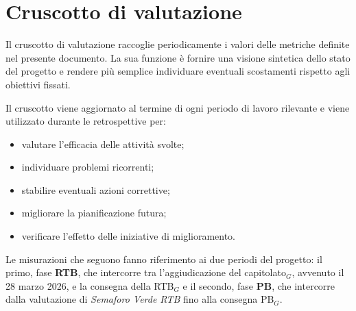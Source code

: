 \documentclass[a4paper, 10pt, colorlinks=true, linkcolor=black, urlcolor=blue, citecolor=blue, hidelinks]{article}
\begin{document}
\section{Cruscotto di valutazione}

Il cruscotto di valutazione raccoglie periodicamente i valori delle metriche definite nel presente documento. La sua funzione è fornire una visione sintetica dello stato del progetto e rendere più semplice individuare eventuali scostamenti rispetto agli obiettivi fissati.

Il cruscotto viene aggiornato al termine di ogni periodo di lavoro rilevante e viene utilizzato durante le retrospettive per:
\begin{itemize}
    \item valutare l'efficacia delle attività svolte;
    \item individuare problemi ricorrenti;
    \item stabilire eventuali azioni correttive;
    \item migliorare la pianificazione futura;
    \item verificare l'effetto delle iniziative di miglioramento.
\end{itemize}

Le misurazioni che seguono fanno riferimento ai due periodi del progetto: il primo, fase \textbf{RTB}, che intercorre tra l'aggiudicazione del capitolato$_G$, avvenuto il 28 marzo 2026, e la consegna della RTB$_G$ e il secondo, fase \textbf{PB}, che intercorre dalla valutazione di \textit{Semaforo Verde RTB} fino alla consegna PB$_G$.
\end{document}

